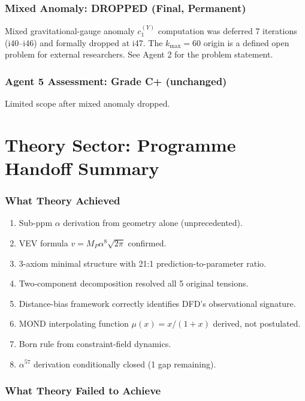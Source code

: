 \documentclass[11pt,a4paper]{article}
\begin{document}
\section{Mixed Anomaly: DROPPED (Final, Permanent)}

Mixed gravitational-gauge anomaly $c_1^{(Y)}$ computation was deferred 7 iterations (i40--i46) and formally dropped at i47. The $k_{\max} = 60$ origin is a defined open problem for external researchers. See Agent 2 for the problem statement.

\section{Agent 5 Assessment: Grade C+ (unchanged)}

Limited scope after mixed anomaly dropped.


\part{Theory Sector: Programme Handoff Summary}
\label{part:handoff}

\section{What Theory Achieved}

\begin{enumerate}
\item Sub-ppm $\alpha$ derivation from geometry alone (unprecedented).
\item VEV formula $v = M_P \alpha^8 \sqrt{2\pi}$ confirmed.
\item 3-axiom minimal structure with 21:1 prediction-to-parameter ratio.
\item Two-component decomposition resolved all 5 original tensions.
\item Distance-bias framework correctly identifies DFD's observational signature.
\item MOND interpolating function $\mu(x) = x/(1+x)$ derived, not postulated.
\item Born rule from constraint-field dynamics.
\item $\alpha^{57}$ derivation conditionally closed (1 gap remaining).
\end{enumerate}

\section{What Theory Failed to Achieve}
\end{document}
